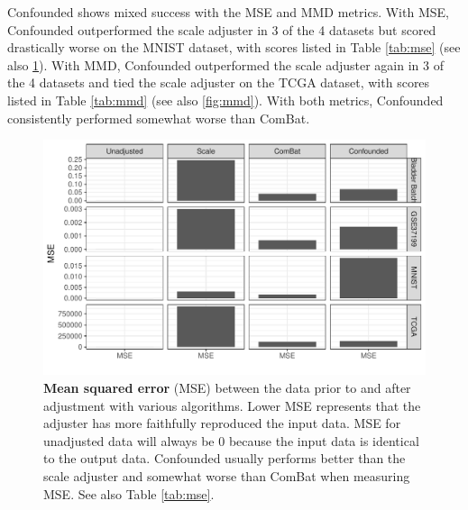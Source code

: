 \documentclass[11pt]{article}
\begin{document}
Confounded shows mixed success with the MSE and MMD metrics.
With MSE, Confounded outperformed the scale adjuster in 3 of the 4 datasets but scored drastically worse on the MNIST dataset, with scores listed in Table \ref{tab:mse} (see also \figurename{} \ref{fig:mse}).
With MMD, Confounded outperformed the scale adjuster again in 3 of the 4 datasets and tied the scale adjuster on the TCGA dataset, with scores listed in Table \ref{tab:mmd} (see also \figurename{} \ref{fig:mmd}).
With both metrics, Confounded consistently performed somewhat worse than ComBat.

\begin{figure}
	\centering
	\includegraphics[width=\columnwidth]{figures/final/mse.pdf}
	\caption[Mean squared error (MSE)]{
		\textbf{Mean squared error} (MSE) between the data prior to and after adjustment with various algorithms.
		Lower MSE represents that the adjuster has more faithfully reproduced the input data.
		MSE for unadjusted data will always be 0 because the input data is identical to the output data.
		Confounded usually performs better than the scale adjuster and somewhat worse than ComBat when measuring MSE.
		See also Table \ref{tab:mse}.
	}
	\label{fig:mse}
\end{figure}
\begin{table}
	
	\caption[Mean squared error (MSE)]{
		\textbf{Mean squared error (MSE)} of the unadjusted input data compared to the data output by the given adjusters.
		Lower MSE indicates that the output has changed less from the input.
		See also \figurename{} \ref{fig:mse}.
	}
	\label{tab:mse}
\end{table}
\end{document}
